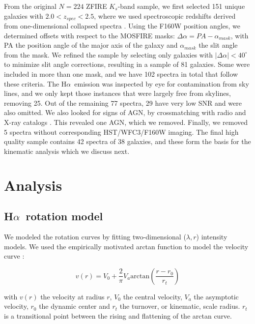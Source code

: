 \documentclass{emulateapj}
\newcommand{\ha}{H$\alpha$}
\begin{document}
From the original {$N=224$} ZFIRE $K_s$-band sample, we first selected 15{1} unique galaxies with $2.0<z_{spec}<2.5$, where we used spectroscopic redshifts derived from one-dimensional collapsed spectra \citep{Nanayakkara16}. Using the F160W position angles, we determined offsets with respect to the MOSFIRE masks: $\Delta\alpha=PA-\alpha_{mask}$, with PA the position angle of the major axis of the galaxy and $\alpha_{mask}$ the slit angle from the mask. We refined the sample by selecting only galaxies with $|\Delta\alpha|<40^{\circ}$ {to minimize slit angle corrections}, resulting in a sample of {81} galaxies. Some were included in more than one mask, and we have {102} spectra in total that follow these criteria. The \ha\ emission was inspected by eye for contamination from sky lines, and we only kept those instances that were largely free from skylines, removing {25}. Out of the remaining {77} spectra, {29} have very low SNR and were also omitted. We also looked for signs of AGN, by crossmatching with radio and X-ray catalogs \citep{Cowley16}. This revealed one AGN, which we removed. {Finally, we removed 5 spectra without corresponding HST/WFC3/F160W imaging.} The final high quality sample contains {42} spectra of {38} galaxies, and these form the basis for the kinematic analysis which we discuss next.


\section{Analysis}
\label{sec:analysis}

\subsection{\ha\ rotation model}

We modeled the rotation curves by fitting two-dimensional ($\lambda,r$) intensity models. We used the empirically motivated arctan function to model the velocity curve \citep{Courteau97,Willick97,Miller11}:

\begin{equation}
v(r)=V_0+\frac{2}{\pi}V_a \mathrm{arctan}\left(\frac{r-r_0}{r_t}\right)
\label{eq:vat}
\end{equation}

with $v(r)$ the velocity at radius $r$, $V_0$ the central velocity, $V_a$ the asymptotic velocity, $r_0$ the dynamic center and $r_t$ the turnover, or kinematic, scale radius. $r_t$ is a transitional point between the rising and flattening of the arctan curve. 
\end{document}

